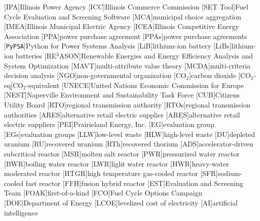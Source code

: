 [IPA]{Illinois Power Agency}
[ICC]{Illinois Commerce Commission}
[SET Tool]{Fuel Cycle Evaluation and Screening Software}
[MCA]{municipal choice aggregation}
[IMEA]{Illinois Municipal Electric Agency}
[ICEA]{Illinois Competitive Energy Association}
[PPA]{power purchase agreement}
[PPAs]{power purchase agreements}
[\texttt{PyPSA}]{Python for Power Systems Analysis}
[LiB]{lithium-ion battery}
[LiBs]{lithium-ion batteries}
[RE$^3$ASON]{Renewable Energies and Energy Efficiency Analysis and System Optimization}
[MAVT]{multi-attribute value theory}
[MCDA]{multi-criteria decision analysis}
[NGO]{non-governmental organization}
[CO$_2$]{carbon dioxide}
[CO$_2$-eq]{CO$_2$-equivalent}
[UNECE]{United Nations Economic Commission for Europe}
[NEST]{Naperville Environment and Sustainability Task Force}
[CUB]{Citizens Utility Board}
[RTO]{regional transmission authority}
[RTOs]{regional transmission authorities}
[ARES]{alternative retail electric supplier}
[ARES]{alternative retail electric suppliers}
[PEI]{Prairieland Energy, Inc.}
[EG]{evaluation group}
[EGs]{evaluation groups}
[LLW]{low-level waste}
[HLW]{high-level waste}
[DU]{depleted uranium}
[RU]{recovered uranium}
[RTh]{recovered thorium}
[ADS]{accelerator-driven subcritical reactor}
[MSR]{molten salt reactor}
[PWR]{pressurized water reactor}
[BWR]{boiling water reactor}
[LWR]{light water reactor}
[HWR]{heavy-water moderated reactor}
[HTGR]{high temperature gas-cooled reactor}
[SFR]{sodium-cooled fast reactor}
[FFH]{fusion hybrid reactor}
[EST]{Evaluation and Screening Team}
[FOAK]{first-of-a-kind}
[FCO]{Fuel Cycle Options Campaign}
[DOE]{Department of Energy}
[LCOE]{levelized cost of electricity}
[AI]{artificial intelligence}


